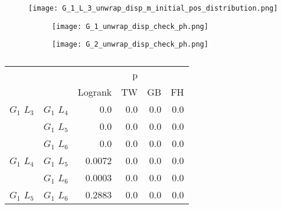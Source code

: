         \begin{figure}
         \centering
         \texttt{[image: G\_1\_L\_3\_unwrap\_disp\_m\_initial\_pos\_distribution.png]}
         \caption{}
         \label{fig:G_1_L_3_disp_pink_initial_pos_distribution}
        \end{figure}


        

        \begin{figure}
        \centering
        \begin{subfigure}[b]{0.45\textwidth}
          \texttt{[image: G\_1\_unwrap\_disp\_check\_ph.png]}
          \caption{}
          \label{fig:g1_disp_check_ph}
        \end{subfigure}
        \hfill
        \begin{subfigure}[b]{0.45\textwidth}
          \texttt{[image: G\_2\_unwrap\_disp\_check\_ph.png]}
          \caption{}
          \label{fig:g1_disp_check_ph}
        \end{subfigure}
        \caption{}
        \label{fig:branch_disp_check_ph}
      \end{figure}

        
      

      \begin{table}
        \centering
        \begin{tabular}{llrrrr}
          \toprule
                       &             &         &  p &    &     \\
          \cmidrule{3-6}
                       &             & Logrank & TW & GB & FH  \\
          \midrule
          $G_1$ $L_3$  & $G_1$ $L_4$  &  0.0 &  0.0 &  0.0 &  0.0     \\
                       & $G_1$ $L_5$  & 0.0 & 0.0 & 0.0 & 0.0    \\
                       & $G_1$ $L_6$  & 0.0 & 0.0 & 0.0 & 0.0      \\
          $G_1$ $L_4$  & $G_1$ $L_5$  & 0.0072 & 0.0 & 0.0 & 0.0      \\
                       & $G_1$ $L_6$  & 0.0003 & 0.0 & 0.0 & 0.0       \\
          $G_1$ $L_5$   & $G_1$ $L_6$ & 0.2883 &  0.0 & 0.0 & 0.0      \\
          \bottomrule
        \end{tabular}
        \label{tab:g1_ingroup_tests_disp}
        \caption{}
      \end{table}


